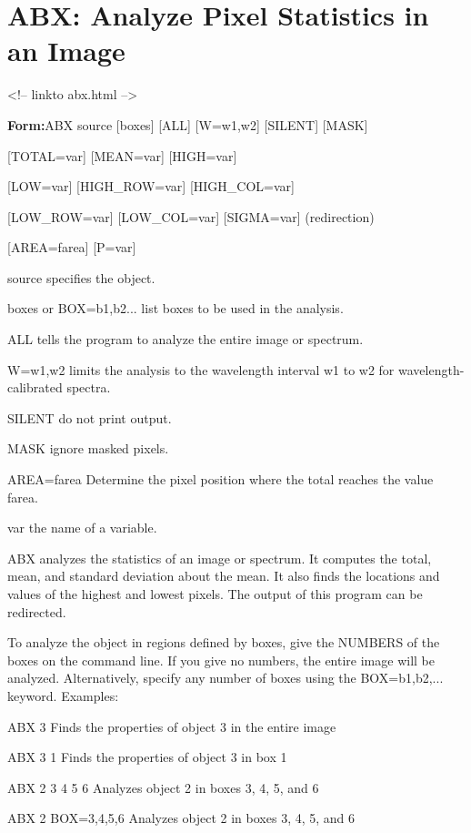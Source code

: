 \section{ABX: Analyze Pixel Statistics in an Image}
\begin{rawhtml}
<!-- linkto abx.html -->
\end{rawhtml}
\begin{command}
  \item[\textbf{Form:}ABX source {[boxes]} {[ALL]} {[W=w1,w2]} {[SILENT]} 
       {[MASK]}\hfill]{}
  \item{{[TOTAL=var]} {[MEAN=var]} {[HIGH=var]}}
  \item{{[LOW=var]} {[HIGH\_ROW=var]} {[HIGH\_COL=var]}}
  \item{{[LOW\_ROW=var]} {[LOW\_COL=var]} {[SIGMA=var]} (redirection)}
  \item{{[AREA=farea]} {[P=var]}}
  \item[source]{specifies the object.}
  \item[boxes or BOX=b1,b2...]{list boxes to be used in the analysis.}
  \item[ALL]{tells the program to analyze the entire image or spectrum.}
  \item[W=w1,w2]{limits the analysis to the wavelength interval w1 to w2 for 
       wavelength-calibrated spectra.}
  \item[SILENT]{do not print output.} 
  \item[MASK]{ignore masked pixels.}
  \item[AREA=farea]{Determine the pixel position where the total reaches
       the value farea.}
  \item[var]{the name of a variable.}
\end{command}

ABX analyzes the statistics of an image or spectrum.  It computes the total,
mean, and standard deviation about the mean.  It also finds the locations
and values of the highest and lowest pixels.  The output of this program
can be redirected.

To analyze the object in regions defined by boxes, give the NUMBERS of the
boxes on the command line.  If you give no numbers, the entire image will
be analyzed. Alternatively, specify any number of boxes using the
BOX=b1,b2,... keyword. Examples:
\begin{example}
  \item[ABX 3\hfill]{Finds the properties of object 3 in the entire image}
  \item[ABX 3 1\hfill]{Finds the properties of object 3 in box 1}
  \item[ABX 2 3 4 5 6\hfill]{Analyzes object 2 in boxes 3, 4, 5, and 6}
  \item[ABX 2 BOX=3,4,5,6 \hfill]{Analyzes object 2 in boxes 3, 4, 5, and 6}
\end{example}

